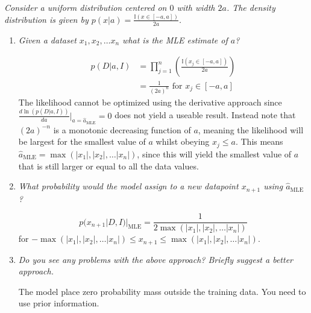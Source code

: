 \begin{example}
	\emph{Consider a uniform distribution centered on $0$ with width $2a$. The density distribution is given by $p(x|a)=\frac{\mathbb{I}(x\in[-a,a])}{2a}$.}
	
	\begin{enumerate}
		\item \emph{Given a dataset $x_1,x_2,\dots x_n$ what is the MLE estimate of $a$?}
		
		\begin{equation}
			\begin{split}
				p(D|a,I)&=\prod_{j=1}^n(\frac{\mathbb{I}(x_j\in[-a,a])}{2a})\\
				&=\frac{1}{(2a)^n} \text{ for $x_j\in [-a,a]$}
			\end{split}
		\end{equation}
		The likelihood cannot be optimized using the derivative approach since $\frac{d\ln(p(D|a,I))}{da}\big|_{a=\hat{a}_{\text{MLE}}}=0$ does not yield a useable result. Instead note that $(2a)^{-n}$ is a monotonic decreasing function of $a$, meaning the likelihood will be largest for the smallest value of $a$ whilst obeying $x_j\leq a$. This means $\hat{a}_{\text{MLE}}=\max(|x_1|,|x_2|,\dots |x_n|)$, since this will yield the smallest value of $a$ that is still larger or equal to all the data values.
		
		\item \emph{What probability would the model assign to a new datapoint $x_{n+1}$ using $\hat{a}_{\text{MLE}}$?}
		
		\begin{equation}
			p(x_{n+1}|D,I)|_{\text{MLE}} =\frac{1}{2\max(|x_1|,|x_2|,\dots |x_n|)}
		\end{equation}
		for $-\max(|x_1|,|x_2|,\dots |x_n|) \leq x_{n+1}\leq \max(|x_1|,|x_2|,\dots |x_n|)$.
		
		\item \emph{Do you see any problems with the above approach? Briefly suggest a better approach.}\newline
		
		The model place zero probability mass outside the training data. You need to use prior information.
	\end{enumerate}
\end{example}





